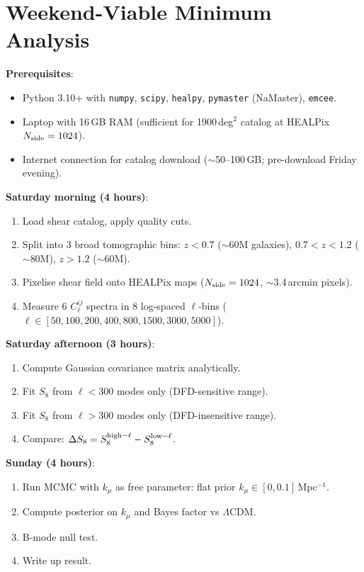\documentclass[11pt,a4paper]{article}
\newcommand{\LCDM}{$\Lambda$CDM}
\newcommand{\kmu}{k_\mu}
\begin{document}
\section{Weekend-Viable Minimum Analysis}
\label{sec:weekend}

\begin{granitebox}

\textbf{Prerequisites}:
\begin{itemize}[nosep]
\item Python 3.10+ with \texttt{numpy}, \texttt{scipy}, \texttt{healpy},
  \texttt{pymaster} (NaMaster), \texttt{emcee}.
\item Laptop with 16\,GB RAM (sufficient for 1900\,deg$^2$ catalog at
  HEALPix $N_{\rm side} = 1024$).
\item Internet connection for catalog download ($\sim$50--100\,GB;
  pre-download Friday evening).
\end{itemize}

\textbf{Saturday morning (4 hours)}:
\begin{enumerate}[nosep]
\item Load shear catalog, apply quality cuts.
\item Split into 3 broad tomographic bins:
  $z < 0.7$ ($\sim$60M galaxies), $0.7 < z < 1.2$ ($\sim$80M),
  $z > 1.2$ ($\sim$60M).
\item Pixelise shear field onto HEALPix maps ($N_{\rm side} = 1024$,
  $\sim$3.4\,arcmin pixels).
\item Measure 6 $C_\ell^{ij}$ spectra in 8 log-spaced $\ell$-bins
  ($\ell \in [50, 100, 200, 400, 800, 1500, 3000, 5000]$).
\end{enumerate}

\textbf{Saturday afternoon (3 hours)}:
\begin{enumerate}[nosep, start=5]
\item Compute Gaussian covariance matrix analytically.
\item Fit $S_8$ from $\ell < 300$ modes only (DFD-sensitive range).
\item Fit $S_8$ from $\ell > 300$ modes only (DFD-insensitive range).
\item Compare: $\Delta S_8 = S_8^{\rm high-\ell} - S_8^{\rm low-\ell}$.
\end{enumerate}

\textbf{Sunday (4 hours)}:
\begin{enumerate}[nosep, start=9]
\item Run MCMC with $\kmu$ as free parameter: flat prior
  $\kmu \in [0, 0.1]$\,Mpc$^{-1}$.
\item Compute posterior on $\kmu$ and Bayes factor vs \LCDM.
\item B-mode null test.
\item Write up result.
\end{enumerate}


\end{granitebox}
\end{document}
